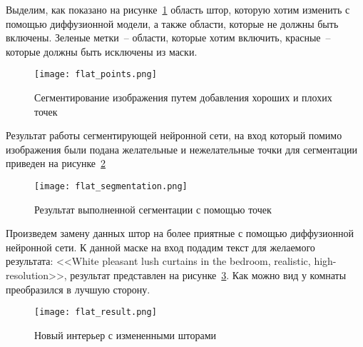 Выделим, как показано на рисунке~\ref{man::flat_points} область штор, которую хотим изменить с помощью диффузионной модели, а также области, которые не должны быть включены. Зеленые метки~-- области, которые хотим включить, красные~-- которые должны быть исключены из маски.

\begin{figure}[ht]
    \centering
    \texttt{[image: flat\_points.png]}
    \caption{Сегментирование изображения путем добавления хороших и плохих точек}
    \label{man::flat_points}
\end{figure}

Результат работы сегментирующей нейронной сети, на вход который помимо изображения были подана желательные и нежелательные точки для сегментации приведен на рисунке~\ref{manual::flat_seg_result}

\begin{figure}[ht]
    \centering
    \texttt{[image: flat\_segmentation.png]}
    \caption{Результат выполненной сегментации с помощью точек}
    \label{manual::flat_seg_result}
\end{figure}

Произведем замену данных штор на более приятные с помощью диффузионной нейронной сети. К данной маске на вход подадим текст для желаемого результата: <<White pleasant lush curtains in the bedroom, realistic, high-resolution>>, результат представлен на рисунке~\ref{man::flat_result}. Как можно вид у комнаты преобразился в лучшую сторону. 

\begin{figure}[ht]
    \centering
    \texttt{[image: flat\_result.png]}
    \caption{Новый интерьер с измененными шторами}
    \label{man::flat_result}
\end{figure}
